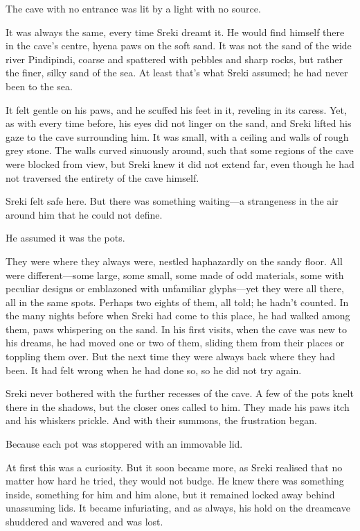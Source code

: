 The cave with no entrance was lit by a light with no source.

It was always the same, every time Sreki dreamt it. He would find himself there in the cave's centre, hyena paws on the soft sand. It was not the sand of the wide river Pindipindi, coarse and spattered with pebbles and sharp rocks, but rather the finer, silky sand of the sea. At least that's what Sreki assumed; he had never been to the sea.

It felt gentle on his paws, and he scuffed his feet in it, reveling in its caress. Yet, as with every time before, his eyes did not linger on the sand, and Sreki lifted his gaze to the cave surrounding him. It was small, with a ceiling and walls of rough grey stone. The walls curved sinuously around, such that some regions of the cave were blocked from view, but Sreki knew it did not extend far, even though he had not traversed the entirety of the cave himself.

Sreki felt safe here. But there was something waiting---a strangeness in the air around him that he could not define.

He assumed it was the pots.

They were where they always were, nestled haphazardly on the sandy floor. All were different---some large, some small, some made of odd materials, some with peculiar designs or emblazoned with unfamiliar glyphs---yet they were all there, all in the same spots. Perhaps two eights of them, all told; he hadn't counted. In the many nights before when Sreki had come to this place, he had walked among them, paws whispering on the sand. In his first visits, when the cave was new to his dreams, he had moved one or two of them, sliding them from their places or toppling them over. But the next time they were always back where they had been. It had felt wrong when he had done so, so he did not try again.

Sreki never bothered with the further recesses of the cave. A few of the pots knelt there in the shadows, but the closer ones called to him. They made his paws itch and his whiskers prickle. And with their summons, the frustration began.

Because each pot was stoppered with an immovable lid.

At first this was a curiosity. But it soon became more, as Sreki realised that no matter how hard he tried, they would not budge. He knew there was something inside, something for him and him alone, but it remained locked away behind unassuming lids. It became infuriating, and as always, his hold on the dreamcave shuddered and wavered and was lost.

